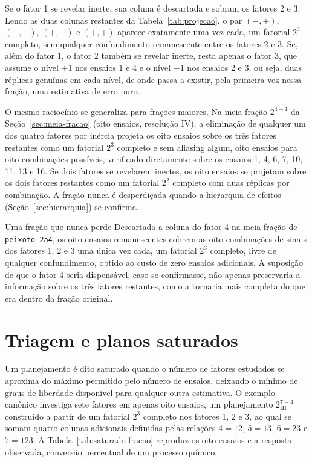 \documentclass{doeapostila}
\begin{document}
Se o fator 1 se revelar inerte, sua coluna é descartada e sobram os fatores 2
e 3. Lendo as duas colunas restantes da Tabela~\ref{tab:projecao}, o par
$(-,+)$, $(-,-)$, $(+,-)$ e $(+,+)$ aparece exatamente uma vez cada, um
fatorial $2^{2}$ completo, sem qualquer confundimento remanescente entre os
fatores 2 e 3. Se, além do fator 1, o fator 2 também se revelar inerte,
resta apenas o fator 3, que assume o nível $+1$ nos ensaios 1 e 4 e o nível
$-1$ nos ensaios 2 e 3, ou seja, duas réplicas genuínas em cada nível, de
onde passa a existir, pela primeira vez nessa fração, uma estimativa de erro
puro.

O mesmo raciocínio se generaliza para frações maiores. Na meia-fração
$2^{4-1}$ da Seção~\ref{sec:meia-fracao} (oito ensaios, resolução IV), a
eliminação de qualquer um dos quatro fatores por inércia projeta os oito
ensaios sobre os três fatores restantes como um fatorial $2^{3}$ completo e
sem aliasing algum, oito ensaios para oito combinações possíveis, verificado
diretamente sobre os ensaios 1, 4, 6, 7, 10, 11, 13 e 16. Se dois fatores se
revelarem inertes, os oito ensaios se projetam sobre os dois fatores
restantes como um fatorial $2^{2}$ completo com duas réplicas por
combinação. A fração nunca é desperdiçada quando a hierarquia de efeitos
(Seção~\ref{sec:hierarquia}) se confirma.

\begin{aplicacao}{Uma fração que nunca perde}
  Descartada a coluna do fator 4 na meia-fração de \texttt{peixoto-2a4}, os
  oito ensaios remanescentes cobrem as oito combinações de sinais dos
  fatores 1, 2 e 3 uma única vez cada, um fatorial $2^{3}$ completo, livre de
  qualquer confundimento, obtido ao custo de zero ensaios adicionais. A
  suposição de que o fator 4 seria dispensável, caso se confirmasse, não
  apenas preservaria a informação sobre os três fatores restantes, como a
  tornaria mais completa do que era dentro da fração original.
\end{aplicacao}

\section{Triagem e planos saturados}
\label{sec:saturados}

Um planejamento é dito saturado quando o número de fatores estudados se
aproxima do máximo permitido pelo número de ensaios, deixando o mínimo de
graus de liberdade disponível para qualquer outra estimativa. O exemplo
canônico investiga sete fatores em apenas oito ensaios, um planejamento
$2^{7-4}_{\mathrm{III}}$ construído a partir de um fatorial $2^{3}$ completo
nos fatores 1, 2 e 3, ao qual se somam quatro colunas adicionais definidas
pelas relações $4 = 12$, $5 = 13$, $6 = 23$ e $7 = 123$. A Tabela~\ref{tab:saturado-fracao}
reproduz os oito ensaios e a resposta observada, conversão percentual de um
processo químico.
\end{document}
